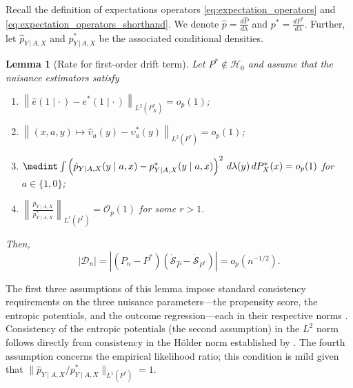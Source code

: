 \documentclass{article}
\theoremstyle{plain}
\newtheorem{lemma}[theorem]{Lemma}
\theoremstyle{definition}
\theoremstyle{remark}
\newcommand{\of}[1]{\left(#1\right)}
\newcommand{\abs}[1]{\left|#1\right|}
\newcommand{\cD}{\mathcal{D}}
\newcommand{\cO}{\mathcal{O}}
\newcommand{\ucH}{\mathscr{H}}
\newcommand{\wh}[1]{\widehat{#1}}
\newcommand{\hP}{\widehat{P}}
\newcommand{\1}{\mathbbm{1}}
\newcommand{\STE}{\mathscr{S}}
\newcommand{\norm}[1]{\left \| #1 \right \|}
\theoremstyle{plain}
\theoremstyle{definition}
\newcommand{\mymid}{\,|\,}
\begin{document}
Recall the definition of expectations operators \eqref{eq:expectation_operators} and \eqref{eq:expectation_operators_shorthand}. We denote $\wh{p} = \tfrac{d\hP}{d\lambda}$ and $p^* = \tfrac{dP^*}{d \lambda}$. Further, let $\wh{p}_{Y \mymid A, X}$ and $p^*_{Y \mymid A, X}$ be the associated conditional densities. 
\begin{lemma}[Rate for first-order drift term]\label{lem:first_order_drift_term}
    Let $P^* \notin \ucH_0$ and assume that the nuisance estimators satisfy
    \begin{enumerate}
        \item $\norm{\hat{e}(1 \mid \cdot\,) - e^*(1 \mid \cdot\,)}_{L^2(P^*_X)} = o_p(1)$;
        \item $\norm{(x,a,y)\mapsto \wh{\upsilon}_a(y) - \upsilon_a^*(y)}_{L^2(P^*)} = o_p(1)$;
        \item $ \medint\int  \of{\hat{p}_{Y \mid A, X}(y \mid a, x) - p^*_{Y \mid A, X}(y \mid a,x)}^2 \, d\lambda(y) \, dP^*_{X}(x) = o_p(1)$ for $a \in \{1,0\}$;
        \item $\norm{\frac{\wh{p}_{Y \mid A, X}}{{p}^*_{Y \mid A, X}}}_{L^r(P^*)} =\cO_p(1)$ for some $r>1$.
    \end{enumerate}
     Then,
    \[
    \abs{\cD_n} = \abs{(P_n - P^*) (\dot{\STE}_{\hP} - \dot{\STE}_{P^*})} = o_p(n^{-1/2}).
    \]
\end{lemma}
The first three assumptions of this lemma impose standard consistency requirements on the three nuisance parameters—the propensity score, the entropic potentials, and the outcome regression—each in their respective norms \citep[App.~B.2.5]{luedtke2024one}. Consistency of the entropic potentials (the second assumption) in the $L^2$ norm follows directly from consistency in the Hölder norm established by \citet{del2023improved}. The fourth assumption concerns the empirical likelihood ratio; this condition is mild given that $\|\wh{p}_{Y \mid A, X}/{p}^*_{Y \mid A, X}\|_{L^1(P^*)}=1$. %
\end{document}
